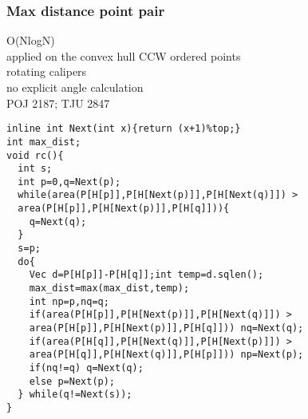 \documentclass[a4paper]{article}
\begin{document}
\subsubsection{Max distance point pair}
O(NlogN) \\
applied on the convex hull CCW ordered points \\
rotating calipers \\
no explicit angle calculation \\
POJ 2187; TJU 2847
\begin{lstlisting}
inline int Next(int x){return (x+1)%top;}
int max_dist;
void rc(){
  int s;
  int p=0,q=Next(p);
  while(area(P[H[p]],P[H[Next(p)]],P[H[Next(q)]]) > 
  area(P[H[p]],P[H[Next(p)]],P[H[q]])){
    q=Next(q);
  }
  s=p;
  do{
    Vec d=P[H[p]]-P[H[q]];int temp=d.sqlen();
    max_dist=max(max_dist,temp);
    int np=p,nq=q;
    if(area(P[H[p]],P[H[Next(p)]],P[H[Next(q)]]) > 
    area(P[H[p]],P[H[Next(p)]],P[H[q]])) nq=Next(q);
    if(area(P[H[q]],P[H[Next(q)]],P[H[Next(p)]]) > 
    area(P[H[q]],P[H[Next(q)]],P[H[p]])) np=Next(p);
    if(nq!=q) q=Next(q);
    else p=Next(p);
  } while(q!=Next(s));
}
\end{lstlisting}
\end{document}
